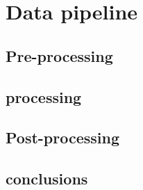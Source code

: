 \section{Data pipeline} \label{section:pipeline}

\subsection{Pre-processing}
\subsection{processing}
\subsection{Post-processing}

\subsection{conclusions}

